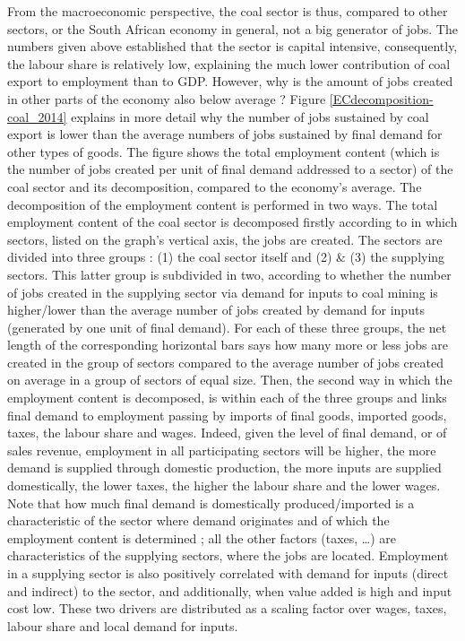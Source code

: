 \documentclass[12pt,english]{article}
\begin{document}
From the macroeconomic perspective, the coal sector is thus, compared to other sectors, or the South African economy in general, not a big generator of jobs. The numbers given above established that the sector is capital intensive, consequently, the labour share is relatively low, explaining the much lower contribution of coal export to employment than to GDP. However, why is the amount of jobs created in other parts of the economy also below average ? Figure \ref{ECdecomposition-coal_2014} explains in more detail why the number of jobs sustained by coal export is lower than the average numbers of jobs sustained by final demand for other types of goods. The figure shows the total employment content (which is the number of jobs created per unit of final demand addressed to a sector) of the coal sector and its decomposition, compared to the economy's average. %
The decomposition of the employment content is performed in two ways. The total employment content of the coal sector is decomposed firstly according to in which sectors, listed on the graph's vertical axis, the jobs are created. The sectors are divided into three groups : (1) the coal sector itself and (2) \& (3) the supplying sectors. This latter group is subdivided in two, according to whether the number of jobs created in the supplying sector via demand for inputs to coal mining is higher/lower than the average number of jobs created by demand for inputs (generated by one unit of final demand). For each of these three groups, the net length of the corresponding horizontal bars says how many more or less jobs are created in the group of sectors compared to the average number of jobs created on average in a group of sectors of equal size. Then, the second way in which the employment content is decomposed, is within each of the three groups and links final demand to employment passing by imports of final goods, imported goods, taxes, the labour share and wages. Indeed, given the level of final demand, or of sales revenue, employment in all participating sectors will be higher, the more demand is supplied through domestic production, the more inputs are supplied domestically, the lower taxes, the higher the labour share and the lower wages. Note that how much final demand is domestically produced/imported is a characteristic of the sector where demand originates and of which the employment content is determined ; all the other factors (taxes, \ldots) are characteristics of the supplying sectors, where the jobs are located. Employment in a supplying sector is also positively correlated with demand for inputs (direct and indirect) to the sector, and additionally, when value added is high and input cost low. These two drivers are distributed as a scaling factor over wages, taxes, labour share and local demand for inputs. 
\end{document}

